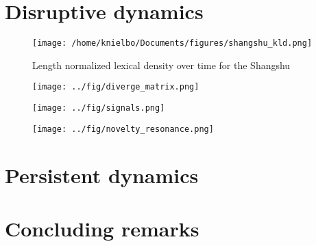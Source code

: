 \section{Disruptive dynamics}
\begin{frame}
\begin{figure}
	\centering
	\texttt{[image: /home/knielbo/Documents/figures/shangshu\_kld.png]}
	\caption{Length normalized lexical density over time for the Shangshu}
\end{figure}
\end{frame}



\begin{frame}
\begin{figure}
	\centering
	\texttt{[image: ../fig/diverge\_matrix.png]}
	\caption{}
\end{figure}
\end{frame}

\begin{frame}
\begin{figure}
	\centering
	\texttt{[image: ../fig/signals.png]}
	\caption{}
\end{figure}
\begin{figure}
	\centering
	\texttt{[image: ../fig/novelty\_resonance.png]}
	\caption{}
\end{figure}
\end{frame}


\section{Persistent dynamics}


\section{Concluding remarks}




